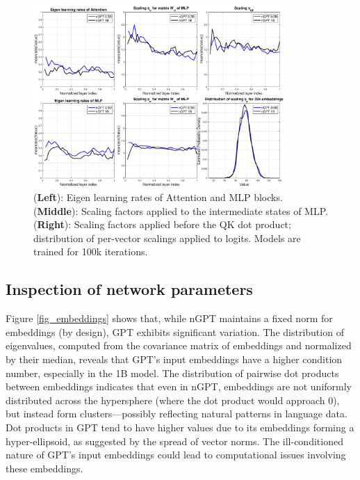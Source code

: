 \documentclass{article} %
\begin{document}
\begin{figure}[t]
\begin{center}
    \includegraphics[width=0.85\textwidth]{newparamsmean.eps} 
\caption{\label{fig_newparams} (\textbf{Left}): Eigen learning rates of Attention and MLP blocks. (\textbf{Middle}): Scaling factors applied to the intermediate states of MLP. (\textbf{Right}): Scaling factors applied before the QK dot product; distribution of per-vector scalings applied to logits. Models are trained for 100k iterations.}  
\end{center}
\end{figure}







 

\subsection{Inspection of network parameters}

Figure \ref{fig_embeddings} shows that, while nGPT maintains a fixed norm for embeddings (by design), GPT exhibits significant variation. The distribution of eigenvalues, computed from the covariance matrix of embeddings and normalized by their median, reveals that GPT’s input embeddings have a higher condition number, especially in the 1B model. The distribution of pairwise dot products between embeddings indicates that even in nGPT, embeddings are not uniformly distributed across the hypersphere (where the dot product would approach 0), but instead form clusters—possibly reflecting natural patterns in language data. Dot products in GPT tend to have higher values due to its embeddings forming a hyper-ellipsoid, as suggested by the spread of vector norms. The ill-conditioned nature of GPT's input embeddings could lead to computational issues involving these embeddings.
\end{document}
